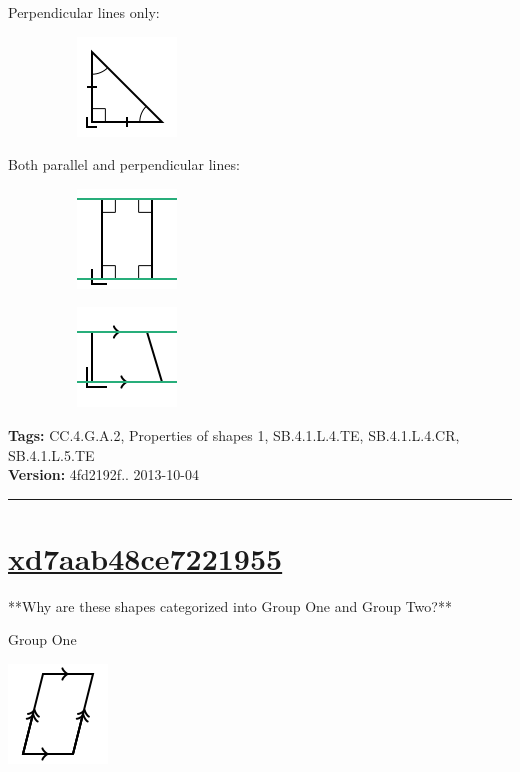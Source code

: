 \documentclass[twocolumn,10pt]{article}
\def\shrinkfactor{0.55}
\begin{document}
Perpendicular lines only:

$\phantom{xxxxxxxx}$
\includegraphics[scale=\shrinkfactor]{figures/f9413d967bb68c6b85d95672324c0a5b08af982e.png}

Both parallel and perpendicular lines:

$\phantom{xxxxxxxx}$
\includegraphics[scale=\shrinkfactor]{figures/ad42bf00e54b665d02d6e9aa787d9d04875ccc6e.png}

$\phantom{xxxxxxxx}$
\includegraphics[scale=\shrinkfactor]{figures/c755ceca3f49cc6303844bb5cd33f40647ddfab0.png}



\medskip
\noindent
\textbf{Tags:} {\footnotesize CC.4.G.A.2, Properties of shapes 1, SB.4.1.L.4.TE, SB.4.1.L.4.CR, SB.4.1.L.5.TE}\\
\textbf{Version:} 4fd2192f.. 2013-10-04
\smallskip\hrule





\section{\href{https://www.khanacademy.org/devadmin/content/items/xd7aab48ce7221955}{xd7aab48ce7221955}}

\noindent
**Why are these shapes categorized into Group One and Group Two?**

Group One 


\includegraphics[scale=\shrinkfactor]{figures/feaa75a1e077e1d8ea6873bc2a4aa206d3c95598.png}
\end{document}
